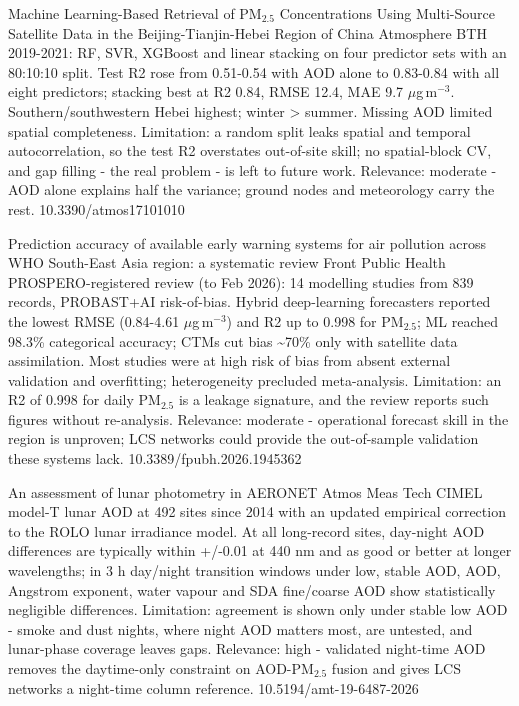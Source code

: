 \documentclass[10pt]{article}
\begin{document}
{Machine Learning-Based Retrieval of PM$_{2.5}$ Concentrations Using Multi-Source Satellite Data in the Beijing-Tianjin-Hebei Region of China}
{Atmosphere}
{BTH 2019-2021: RF, SVR, XGBoost and linear stacking on four predictor sets with an 80:10:10 split. Test R2 rose from 0.51-0.54 with AOD alone to 0.83-0.84 with all eight predictors; stacking best at R2 0.84, RMSE 12.4, MAE 9.7 $\mu$g\,m$^{-3}$. Southern/southwestern Hebei highest; winter > summer. Missing AOD limited spatial completeness. Limitation: a random split leaks spatial and temporal autocorrelation, so the test R2 overstates out-of-site skill; no spatial-block CV, and gap filling - the real problem - is left to future work. Relevance: moderate - AOD alone explains half the variance; ground nodes and meteorology carry the rest.}
{10.3390/atmos17101010}

\par{}\baselineskip{}\baselineskip
{}

{Prediction accuracy of available early warning systems for air pollution across WHO South-East Asia region: a systematic review}
{Front Public Health}
{PROSPERO-registered review (to Feb 2026): 14 modelling studies from 839 records, PROBAST+AI risk-of-bias. Hybrid deep-learning forecasters reported the lowest RMSE (0.84-4.61 $\mu$g\,m$^{-3}$) and R2 up to 0.998 for PM$_{2.5}$; ML reached 98.3\% categorical accuracy; CTMs cut bias \textasciitilde{}70\% only with satellite data assimilation. Most studies were at high risk of bias from absent external validation and overfitting; heterogeneity precluded meta-analysis. Limitation: an R2 of 0.998 for daily PM$_{2.5}$ is a leakage signature, and the review reports such figures without re-analysis. Relevance: moderate - operational forecast skill in the region is unproven; LCS networks could provide the out-of-sample validation these systems lack.}
{10.3389/fpubh.2026.1945362}

{An assessment of lunar photometry in AERONET}
{Atmos Meas Tech}
{CIMEL model-T lunar AOD at 492 sites since 2014 with an updated empirical correction to the ROLO lunar irradiance model. At all long-record sites, day-night AOD differences are typically within +/-0.01 at 440 nm and as good or better at longer wavelengths; in 3 h day/night transition windows under low, stable AOD, AOD, Angstrom exponent, water vapour and SDA fine/coarse AOD show statistically negligible differences. Limitation: agreement is shown only under stable low AOD - smoke and dust nights, where night AOD matters most, are untested, and lunar-phase coverage leaves gaps. Relevance: high - validated night-time AOD removes the daytime-only constraint on AOD-PM$_{2.5}$ fusion and gives LCS networks a night-time column reference.}
{10.5194/amt-19-6487-2026}
\end{document}
